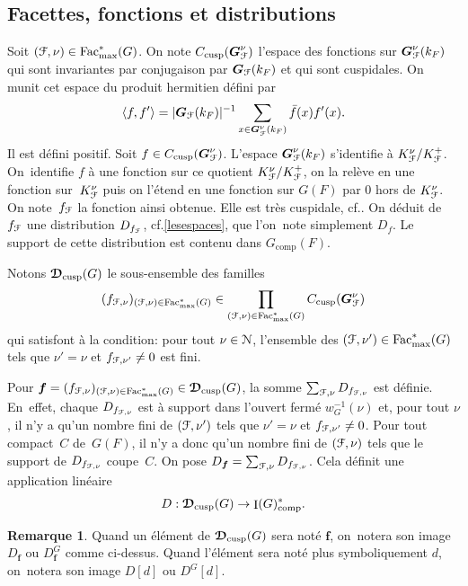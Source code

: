 \documentclass[11pt]{article}
\newcommand{\cf}{cf.\xspace}
\numberwithin{equation}{section}\providecommand{\og}{«\,}\providecommand{\fg}{\,»}
\let\mathcal \EuScript
\let\<\langle
\let\>\rangle
\newcommand{\comp}{\mathrm{comp}}
\newcommand{\cusp}{\mathrm{cusp}}
\newcommand{\Fac}{\mathrm{Fac}}
\DeclareMathOperator{\rI}{I}
\newcommand{\bmf}{\boldsymbol{f}}
\newcommand{\bG}{\boldsymbol{G}}
\newcommand{\cD}{\mathcal{D}}
\newcommand{\cF}{\mathcal{F}}
\newcommand{\cN}{\mathcal{N}}
\theoremstyle{plain}
\theoremstyle{definition}
\newtheorem*{rem*}{Remarque}
\begin{document}
\subsection{Facettes, fonctions et distributions}\label{facettesfonctions}
Soit $(\cF,\nu)\in \Fac_{\max}^*(G)$. On note $C_{\cusp}(\bG^{\nu}_{\cF})$ l'espace des fonctions sur $\bG^{\nu}_{\cF}(k_{F})$ qui sont invariantes par conjugaison par $\bG_{\cF}(k_{F})$ et qui sont cuspidales. On munit cet espace du produit hermitien défini par
\[
\<f,f'\>=\vert \bG_{\cF}(k_{F})\vert ^{-1}\sum_{x\in \bG^{\nu}_{\cF}(k_{F})}\bar{f}(x)f'(x).
\]
Il est défini positif. Soit $f\in C_{\cusp}(\bG^{\nu}_{\cF})$. L'espace $\bG_{\cF}^{\nu}(k_{F})$ s'identifie à $K_{\cF}^{\nu}/K_{\cF}^+$. On~identifie $f$ à une fonction sur ce quotient $K_{\cF}^{\nu}/K_{\cF}^+$, on la relève en une fonction sur~$K_{\cF}^{\nu}$ puis on l'étend en une fonction sur $G(F)$ par $0$ hors de $K_{\cF}^{\nu}$. On note~$f_{\cF}$ la fonction ainsi obtenue. Elle est très cuspidale, \cf \cite[Lem.\,10]{W2}. On déduit de $f_{\cF}$ une distribution $D_{f_{\cF}}$, \cf \ref{lesespaces}, que l'on~note simplement $D_{f}$. Le support de cette distribution est contenu dans $G_{\comp}(F)$.

Notons $\boldsymbol{\cD}_{\cusp}(G)$ le sous-ensemble des familles
\[
(f_{\cF,\nu})_{(\cF,\nu)\in \Fac^*_{\max}(G)}\in \prod_{(\cF,\nu)\in \Fac^*_{\max}(G)}C_{\cusp}(\bG^{\nu}_{\cF})
\]
qui satisfont à la condition: pour tout $\nu\in \cN$, l'ensemble des $(\cF,\nu')\in \Fac^*_{\max}(G)$ tels que $\nu'=\nu$ et $f_{\cF,\nu'}\neq0$ est fini.

Pour $\bmf=(f_{\cF,\nu})_{(\cF,\nu)\in \Fac^*_{\max}(G)}\in \boldsymbol{\cD}_{\cusp}(G)$, la somme $\sum_{\cF,\nu}D_{f_{\cF,\nu}}$ est définie. \hbox{En~effet}, chaque $D_{f_{\cF,\nu}}$ est à support dans l'ouvert fermé $w_{G}^{-1}(\nu)$ et, pour tout $\nu$, il n'y a qu'un nombre fini de $(\cF,\nu')$ tels que $\nu'=\nu$ et $f_{\cF,\nu'}\neq0$. Pour tout compact~$C$ de~$G(F)$, il n'y a donc qu'un nombre fini de $(\cF,\nu)$ tels que le support de $D_{f_{\cF,\nu}}$ coupe~$C$. On pose $D_{\bmf}=\sum_{\cF,\nu}D_{f_{\cF,\nu}}$. Cela définit une application linéaire
\[
D: \boldsymbol{\cD}_{\cusp}(G)\to \rI(G)_{\comp}^*.
\]

\begin{rem*}
Quand un élément de $\boldsymbol{\cD}_{\cusp}(G)$ sera noté $\bmf$, on~notera son image $D_{\bmf}$ ou $D^G_{\bmf}$ comme ci-dessus. Quand l'élément sera noté plus symboliquement $d$, on~notera son image $D[d]$ ou $D^G[d]$.
\end{rem*}
\end{document}
